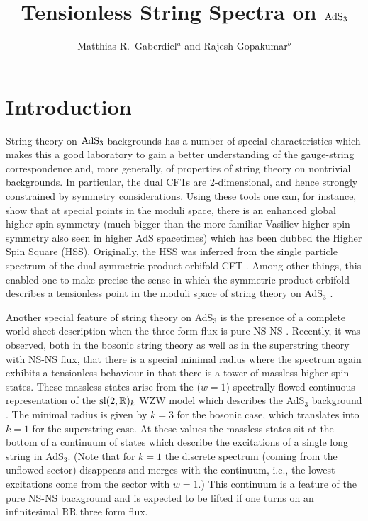 \documentclass[12pt,a4paper]{article}
\title{Tensionless String Spectra on ${\rm AdS}_3$ }
\author{Matthias R.\ Gaberdiel$^a$ and Rajesh Gopakumar$^b$}
\affiliation{$^a$ Institut f\"ur Theoretische Physik, ETH Zurich, \\
\hspace*{0.3cm}CH-8093 Z\"urich, Switzerland}
\affiliation{$^b$ International Centre for Theoretical Sciences-TIFR, \\
\hspace*{0.3cm}Survey No. 151, Shivakote, Hesaraghatta Hobli, \\
\hspace*{0.3cm}Bengaluru North, India 560 089}
\begin{document}

\maketitle



\makeatletter
\g@addto@macro\bfseries{\boldmath}
\makeatother
\section{Introduction}

String theory on ${\rm AdS}_3$ backgrounds has a number of special characteristics which makes this a good laboratory to gain a better understanding of the gauge-string correspondence and, more generally, of properties of string theory on nontrivial backgrounds. In particular, the dual CFTs are $2$-dimensional, and hence strongly constrained by symmetry considerations. Using these tools one can, for instance, show that 
at special points in the moduli space, there is an enhanced global higher spin symmetry \cite{Gaberdiel:2014cha, Gaberdiel:2015mra, Gaberdiel:2015wpo}  (much bigger than the more familiar Vasiliev higher spin symmetry \cite{Vasiliev:2003ev} also seen in higher AdS spacetimes) which has been dubbed the Higher Spin Square (HSS). 
Originally, the HSS was inferred from the single particle spectrum of the dual symmetric product orbifold CFT \cite{Gaberdiel:2015mra, Gaberdiel:2015wpo}.
Among other things, this enabled one to make precise the sense in which the symmetric product orbifold describes a tensionless point in the moduli space of string theory on AdS$_3$ \cite{Gaberdiel:2014cha}. 

Another special feature of string theory on AdS$_3$ is the presence of a complete world-sheet description when the three form flux is pure NS-NS \cite{Maldacena:2000hw, Maldacena:2000kv, Maldacena:2001km}. 
Recently, it was observed, both in the bosonic string theory \cite{Gaberdiel:2017oqg} as well as in the superstring theory \cite{Ferreira:2017pgt} with NS-NS flux, that there is a special minimal radius where the spectrum again exhibits a tensionless behaviour in that there is a tower of massless higher spin states. These massless states arise from the ($w=1$) spectrally flowed continuous representation of the ${\rm sl}(2, \mathbb{R})_k$ WZW model which describes the AdS$_3$ background \cite{Gaberdiel:2017oqg, Ferreira:2017pgt}. The minimal radius is given by $k=3$ for the bosonic case, which translates into $k=1$ for the superstring case. At these values the massless states sit at the bottom of a continuum of states which describe the excitations of a single long string in AdS$_3$. (Note that for $k=1$ the discrete spectrum (coming from the unflowed sector) disappears and merges with the continuum, i.e., the lowest excitations come from the sector with $w=1$.) This continuum is a feature of the pure NS-NS background and is expected to be lifted if one turns on an infinitesimal RR three form flux. 
\end{document}
